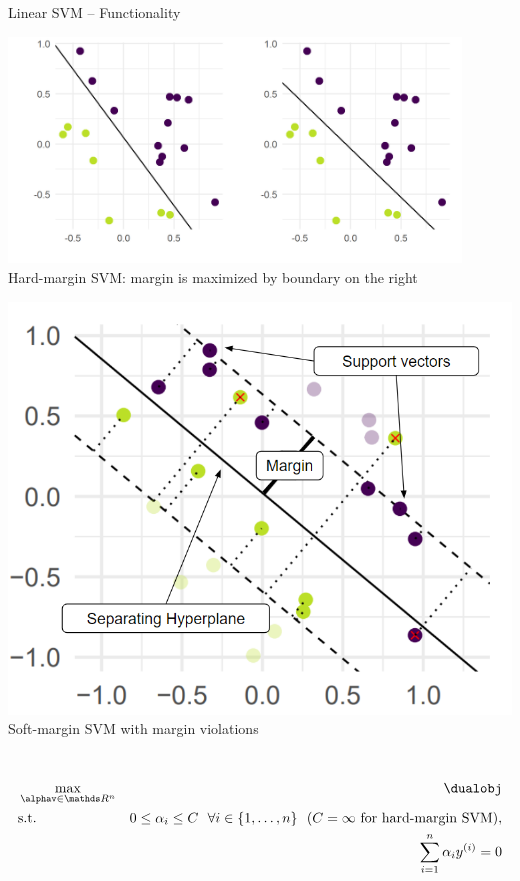 \begin{vbframe}{Linear SVM -- Functionality}
\medskip
\footnotesize
\begin{minipage}{0.6\textwidth}
  \centering
  \includegraphics[width=0.9\textwidth]{
  ../slides/linear-svm/figure/linear_classif_1.png}  \\
  \tiny{Hard-margin SVM: margin is maximized by boundary on the right}
\end{minipage}
\hfill
\begin{minipage}{0.3\textwidth}
  \centering
  \includegraphics[width=1.1\textwidth]{figure/svm_wording.png} \\
  \tiny{Soft-margin SVM with margin violations}
\end{minipage}

\medskip

 ~~ %
\begin{eqnarray*}
    & \max\limits_{\alphav \in \R^n} & \dualobj \\
    & \text{s.t. } & 0 \le \alpha_i \le C ~~ \forall i \in \nset ~~ (C = \infty
    \text{ for hard-margin SVM)}, \\
    & \quad & \sum_{i=1}^n \alpha_i \yi = 0
\end{eqnarray*}


\end{vbframe}
